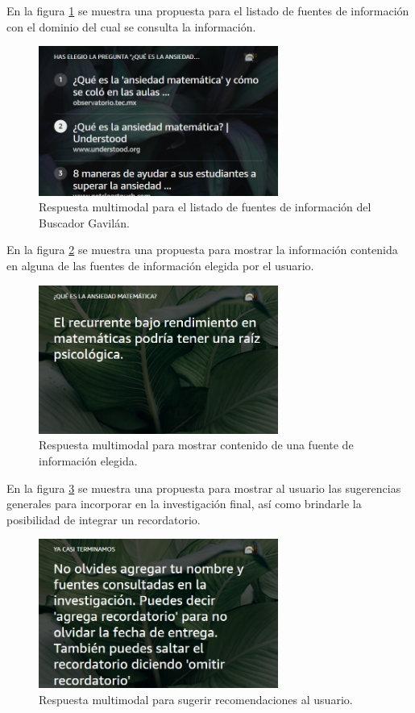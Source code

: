 En la figura \ref{fig:54} se muestra una propuesta para el listado de fuentes de información con el dominio del cual se consulta la información.

\begin{figure}
  \centering
  \includegraphics[width=0.70\textwidth]{Cap5/Figuras/Multimodal3.png}
  \caption{Respuesta multimodal para el listado de fuentes de información del Buscador Gavilán.}
  \label{fig:54}
\end{figure}

En la figura \ref{fig:55} se muestra una propuesta para mostrar la información contenida en alguna de las fuentes de información elegida por el usuario.

\begin{figure}
  \centering
  \includegraphics[width=0.70\textwidth]{Cap5/Figuras/Multimodal4.png}
  \caption{Respuesta multimodal para mostrar contenido de una fuente de información elegida.}
  \label{fig:55}
\end{figure}

En la figura \ref{fig:56} se muestra una propuesta para mostrar al usuario las sugerencias generales para incorporar en la investigación final, así como brindarle la posibilidad de integrar un recordatorio.

\begin{figure}
  \centering
  \includegraphics[width=0.70\textwidth]{Cap5/Figuras/Multimodal5.png}
  \caption{Respuesta multimodal para sugerir recomendaciones al usuario.}
  \label{fig:56}
\end{figure}

